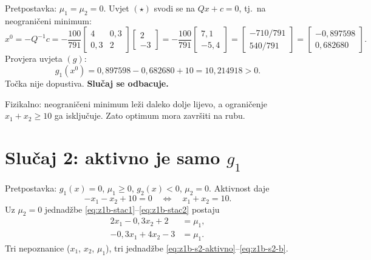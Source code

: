 \begin{korak}
Pretpostavka: $\mu_1 = \mu_2 = 0$. Uvjet $(\star)$ svodi se na $Qx + c = 0$, tj.\
na neograničeni minimum:
\begin{equation}
x^{0} = -Q^{-1}c = -\frac{100}{791}\begin{bmatrix}4 & 0{,}3 \\ 0{,}3 & 2\end{bmatrix}
\begin{bmatrix}2 \\ -3\end{bmatrix}
= -\frac{100}{791}\begin{bmatrix}7{,}1 \\ -5{,}4\end{bmatrix}
= \begin{bmatrix}-710/791 \\ 540/791\end{bmatrix}
= \begin{bmatrix}-0{,}897598 \\ 0{,}682680\end{bmatrix}.
\end{equation}
Provjera uvjeta $(g)$:
\begin{equation}
g_1(x^{0}) = 0{,}897598 - 0{,}682680 + 10 = 10{,}214918 > 0 .
\end{equation}
Točka nije dopustiva. \textbf{Slučaj se odbacuje.}
\end{korak}

Fizikalno: neograničeni minimum leži daleko dolje lijevo, a ograničenje
$x_1 + x_2 \geq 10$ ga isključuje. Zato optimum mora završiti na rubu.

\section{Slučaj 2: aktivno je samo $g_1$}
\label{sec:z1b-slucaj2}

\begin{korak}[Postavljanje]
Pretpostavka: $g_1(x) = 0$, $\mu_1 \geq 0$, $g_2(x) < 0$, $\mu_2 = 0$.
Aktivnost daje
\begin{equation}
-x_1 - x_2 + 10 = 0 \quad\Longleftrightarrow\quad x_1 + x_2 = 10 .
\label{eq:z1b-s2-aktivno}
\end{equation}
Uz $\mu_2 = 0$ jednadžbe \eqref{eq:z1b-stac1}--\eqref{eq:z1b-stac2} postaju
\begin{align}
2x_1 - 0{,}3x_2 + 2 &= \mu_1, \label{eq:z1b-s2-a} \\
-0{,}3x_1 + 4x_2 - 3 &= \mu_1 . \label{eq:z1b-s2-b}
\end{align}
Tri nepoznanice ($x_1$, $x_2$, $\mu_1$), tri jednadžbe
\eqref{eq:z1b-s2-aktivno}--\eqref{eq:z1b-s2-b}.
\end{korak}


